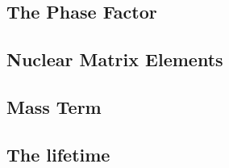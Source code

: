 \subsection{The Phase Factor}
\begin{comment}
Explain the phase factor, calculate it
\end{comment}


\subsection{Nuclear Matrix Elements}
\begin{comment}
Explain the NME - discuss different methods of calculation - QRPA, shell model, IBM, pairing
discuss uncertainties
discuss nuclear physics information that could help pin them down?
\end{comment}


\subsection{Mass Term}
\begin{comment}
Explain the mass term
\end{comment}


\subsection{The lifetime}
\begin{comment}
Discuss some different experiments working on \zvbb and the limits that are currently se on lifetimes and the expected limit for next-generation experiments.
\end{comment}

%
% 
% 
